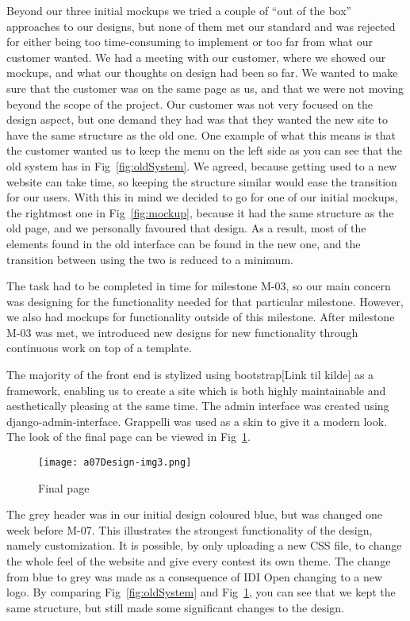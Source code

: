 \pagebreak
Beyond our three initial mockups we tried a couple of ``out
of the box'' approaches to our designs, but none of them
met our standard and was rejected for either being too time-consuming
to implement or too far from what our customer wanted. We had a meeting
with our customer, where we showed our mockups, and what our thoughts
on design had been so far. We wanted to make sure that the customer
was on the same page as us, and that we were not moving beyond the
scope of the project. Our customer was not very focused
on the design aspect, but one demand they had was that they wanted the
new site to have the same structure as the old one. One example of what
this means is that the customer wanted us to keep the menu on the
left side as you can see that the old system has in Fig~\ref{fig:oldSystem}. We agreed,
because getting used to a new website can take time, so keeping the
structure similar would ease the transition for our users. With this in
mind we decided to go for one of our initial mockups, the rightmost one
in Fig~\ref{fig:mockup}, because it had the same structure as the old page, and we
personally favoured that design. As a result, most of the elements
found in the old interface can be found in the new one, and the
transition between using the two is reduced to a minimum.

The task had to be completed in time for milestone M-03, so our main
concern was designing for the functionality needed for that particular
milestone. However, we also had mockups for functionality outside of
this milestone. After milestone M-03 was met, we introduced new designs
for new functionality through continuous work on top of a template.

The majority of the front end is stylized using bootstrap[Link til
kilde] as a framework, enabling us to create a site which is both
highly maintainable and aesthetically pleasing at the same time. The
admin interface was created using django-admin-interface. Grappelli
was used as a skin to give it a modern look. The look of the final page
can be viewed in Fig~\ref{fig:finalUI}.


 \begin{figure}[h!]
	\texttt{[image: a07Design-img3.png]} 
	\caption{Final page}
	\label{fig:finalUI}
\end{figure}

\pagebreak
The grey header was in our
initial design coloured blue, but was changed one week before M-07.
This illustrates the strongest
functionality of the design, namely customization. It is possible, by
only uploading a new CSS file, to change the whole feel of the website
and give every contest its own theme. The change from blue to grey was made
as a consequence of IDI Open changing to a new logo. By comparing
Fig~\ref{fig:oldSystem} and Fig~\ref{fig:finalUI}, you can see that we kept the same structure, but
still made some significant changes to the design.


